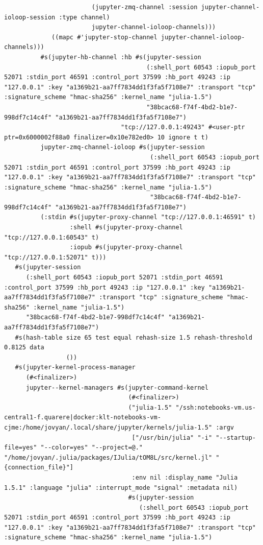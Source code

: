 \documentclass[11pt]{article}
\begin{document}
\begin{enumerate}
\begin{verbatim}
                        (jupyter-zmq-channel :session jupyter-channel-ioloop-session :type channel)
                        jupyter-channel-ioloop-channels)))
             ((mapc #'jupyter-stop-channel jupyter-channel-ioloop-channels)))
          #s(jupyter-hb-channel :hb #s(jupyter-session
                                       (:shell_port 60543 :iopub_port 52071 :stdin_port 46591 :control_port 37599 :hb_port 49243 :ip "127.0.0.1" :key "a1369b21-aa7ff7834dd1f3fa5f7108e7" :transport "tcp" :signature_scheme "hmac-sha256" :kernel_name "julia-1.5")
                                       "38bcac68-f74f-4bd2-b1e7-998df7c14c4f" "a1369b21-aa7ff7834dd1f3fa5f7108e7")
                                "tcp://127.0.0.1:49243" #<user-ptr ptr=0x6000002f88a0 finalizer=0x10e782ed0> 10 ignore t t)
          jupyter-zmq-channel-ioloop #s(jupyter-session
                                        (:shell_port 60543 :iopub_port 52071 :stdin_port 46591 :control_port 37599 :hb_port 49243 :ip "127.0.0.1" :key "a1369b21-aa7ff7834dd1f3fa5f7108e7" :transport "tcp" :signature_scheme "hmac-sha256" :kernel_name "julia-1.5")
                                        "38bcac68-f74f-4bd2-b1e7-998df7c14c4f" "a1369b21-aa7ff7834dd1f3fa5f7108e7")
          (:stdin #s(jupyter-proxy-channel "tcp://127.0.0.1:46591" t)
                  :shell #s(jupyter-proxy-channel "tcp://127.0.0.1:60543" t)
                  :iopub #s(jupyter-proxy-channel "tcp://127.0.0.1:52071" t)))
   #s(jupyter-session
      (:shell_port 60543 :iopub_port 52071 :stdin_port 46591 :control_port 37599 :hb_port 49243 :ip "127.0.0.1" :key "a1369b21-aa7ff7834dd1f3fa5f7108e7" :transport "tcp" :signature_scheme "hmac-sha256" :kernel_name "julia-1.5")
      "38bcac68-f74f-4bd2-b1e7-998df7c14c4f" "a1369b21-aa7ff7834dd1f3fa5f7108e7")
   #s(hash-table size 65 test equal rehash-size 1.5 rehash-threshold 0.8125 data
                 ())
   #s(jupyter-kernel-process-manager
      (#<finalizer>)
      jupyter--kernel-managers #s(jupyter-command-kernel
                                  (#<finalizer>)
                                  ("julia-1.5" "/ssh:notebooks-vm.us-central1-f.quarere|docker:klt-notebooks-vm-cjme:/home/jovyan/.local/share/jupyter/kernels/julia-1.5" :argv
                                   ["/usr/bin/julia" "-i" "--startup-file=yes" "--color=yes" "--project=@." "/home/jovyan/.julia/packages/IJulia/tOM8L/src/kernel.jl" "{connection_file}"]
                                   :env nil :display_name "Julia 1.5.1" :language "julia" :interrupt_mode "signal" :metadata nil)
                                  #s(jupyter-session
                                     (:shell_port 60543 :iopub_port 52071 :stdin_port 46591 :control_port 37599 :hb_port 49243 :ip "127.0.0.1" :key "a1369b21-aa7ff7834dd1f3fa5f7108e7" :transport "tcp" :signature_scheme "hmac-sha256" :kernel_name "julia-1.5")

\end{verbatim}
\end{enumerate}
\end{document}
